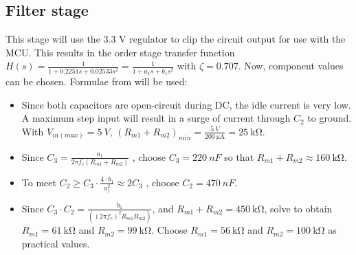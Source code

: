 \subsection{Filter stage}{\label{rangeSensor_filterDesign}}

This stage will use the 3.3 V regulator to clip the circuit output for use with the MCU.
This results in the  order stage transfer function $H(s) = \frac{1}{1 + 0.2251 s + 0.02533 s^2} = \frac{1}{1 + a_1 s + b_1 s^2}$ with $\zeta = 0.707$. Now, component values can be chosen.
Formulae from \cite{filterDesign} will be used:

\begin{itemize}
  \item Since both capacitors are open-circuit during DC, the idle current is very low. A maximum step input will result in a surge of current through $C_2$ to ground.
        With $V_{in(max)} = \SI{5}{V}$, $(R_{m1} + R_{m2})_{min} = \frac{\SI{5}{V}}{\SI{200}{\micro\ampere}} = \SI{25}{\kilo\ohm}$.
  \item Since $C_3 = \frac{a_1}{2 \pi f_c (R_{m1} + R_{m2})}$ \cite{filterDesign}, choose $C_3 = \SI{220}{nF}$ so that $R_{m1} + R_{m2} \approx \SI{160}{\kilo\ohm}$.
  \item To meet $C_2 \geq C_3 \cdot \frac{4 \cdot b_1}{a_1 ^2} \approx 2 C_3 $ \cite{filterDesign}, choose $C_2 = \SI{470}{nF}$.
  \item Since $C_3 \cdot C_2 = \frac{b_1}{((2 \pi f_c)^2 R_{m1} R_{m2})}$, and $R_{m1} + R_{m2} = \SI{450}{\kilo\ohm}$, solve to obtain $R_{m1} = \SI{61}{\kilo\ohm}$ and $R_{m2} = \SI{99}{\kilo\ohm}$.
        Choose $R_{m1} = \SI{56}{\kilo\ohm}$ and $R_{m2} = \SI{100}{\kilo\ohm}$ as practical values.
\end{itemize}